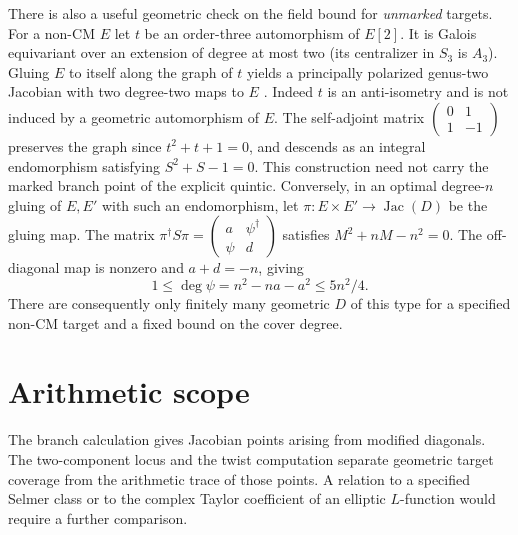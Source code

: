 \documentclass[11pt]{article}
\newcommand{\Jac}{\operatorname{Jac}}
\begin{document}
There is also a useful geometric check on the field bound for
\emph{unmarked} targets. For a non-CM $E$ let $t$ be an order-three
automorphism of $E[2]$. It is Galois equivariant over an extension of
degree at most two (its centralizer in $S_3$ is $A_3$). Gluing $E$ to
itself along the graph of $t$ yields a principally polarized genus-two
Jacobian with two degree-two maps to $E$ \cite[Props.~3--4]{HLP}.
Indeed $t$ is an anti-isometry and is not induced by a geometric
automorphism of $E$. The self-adjoint matrix
$\left(\begin{smallmatrix}0&1\\1&-1\end{smallmatrix}\right)$ preserves
the graph since $t^2+t+1=0$, and descends as an integral endomorphism
satisfying $S^2+S-1=0$. This construction need not carry the marked
branch point of the explicit quintic. Conversely, in an optimal
degree-$n$ gluing of $E,E'$ with such an endomorphism, let
$\pi:E\times E'\to\Jac(D)$ be the gluing map. The matrix
$\pi^\dagger S\pi=\left(\begin{smallmatrix}a&\psi^\dagger\\
\psi&d\end{smallmatrix}\right)$ satisfies $M^2+nM-n^2=0$.
The off-diagonal map is nonzero and $a+d=-n$, giving
\[
 1\le\deg\psi=n^2-na-a^2\le5n^2/4 .
\]
There are consequently only finitely many geometric $D$ of this type
for a specified non-CM target and a fixed bound on the cover degree.

\section*{Arithmetic scope}
The branch calculation gives Jacobian points arising from
modified diagonals. The two-component locus and the twist computation
separate geometric target coverage from the arithmetic trace of those
points. A relation to a specified Selmer class or to the complex Taylor
coefficient of an elliptic $L$-function would require a further
comparison.
\end{document}
